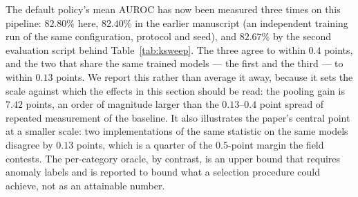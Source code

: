 \begin{table}[t]
\centering
\caption{Sensitivity of the pooling gain to the top-$k$ fraction, uniform weights,
15 categories, computed by a second evaluation script on the same seed-42 trained
models. Every row in this table shares those maps, so the comparison is internally
exact; the script's reading of the default policy, $82.67\%$, differs by $0.13$
points from the $82.80\%$ of Table~\ref{tab:fusion}, which is the level at which
two independent implementations of the same statistic agree on this pipeline (see
the text).}
\label{tab:ksweep}

\end{table}

The default policy's mean AUROC has now been measured three times on this
pipeline: $82.80\%$ here, $82.40\%$ in the earlier manuscript (an independent
training run of the same configuration, protocol and seed), and $82.67\%$ by the
second evaluation script behind Table~\ref{tab:ksweep}. The three agree to within
$0.4$ points, and the two that share the same trained models --- the first and the
third --- to within $0.13$ points. We report this rather than average it away,
because it sets the scale against which the effects in this section should be
read: the pooling gain is $7.42$ points, an order of magnitude larger than the
$0.13$--$0.4$ point spread of repeated measurement of the baseline. It also
illustrates the paper's central point at a smaller scale: two implementations of
the same statistic on the same models disagree by $0.13$ points, which is a
quarter of the $0.5$-point margin the field contests. The per-category oracle, by
contrast, is an upper bound that requires anomaly labels and is reported to bound
what a selection procedure could achieve, not as an attainable number.

